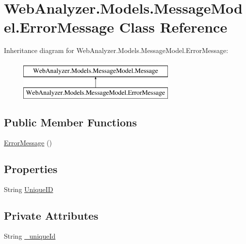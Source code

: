 \hypertarget{class_web_analyzer_1_1_models_1_1_message_model_1_1_error_message}{}\section{Web\+Analyzer.\+Models.\+Message\+Model.\+Error\+Message Class Reference}
\label{class_web_analyzer_1_1_models_1_1_message_model_1_1_error_message}
Inheritance diagram for Web\+Analyzer.\+Models.\+Message\+Model.\+Error\+Message\+:\begin{figure}[H]
\begin{center}
\leavevmode
\includegraphics[height=2.000000cm]{class_web_analyzer_1_1_models_1_1_message_model_1_1_error_message}
\end{center}
\end{figure}
\subsection*{Public Member Functions}
\begin{DoxyCompactItemize}
\item 
\hyperlink{class_web_analyzer_1_1_models_1_1_message_model_1_1_error_message_a698b976007d5e81f96339ba1673ba6b3}{Error\+Message} ()
\end{DoxyCompactItemize}
\subsection*{Properties}
\begin{DoxyCompactItemize}
\item 
String \hyperlink{class_web_analyzer_1_1_models_1_1_message_model_1_1_error_message_a795e90650dd234f29a110e27643828e2}{Unique\+I\+D}
\end{DoxyCompactItemize}
\subsection*{Private Attributes}
\begin{DoxyCompactItemize}
\item 
String \hyperlink{class_web_analyzer_1_1_models_1_1_message_model_1_1_error_message_a06154fcc80f03446f4ed2a4e82ac6bd3}{\+\_\+unique\+Id}
\end{DoxyCompactItemize}

